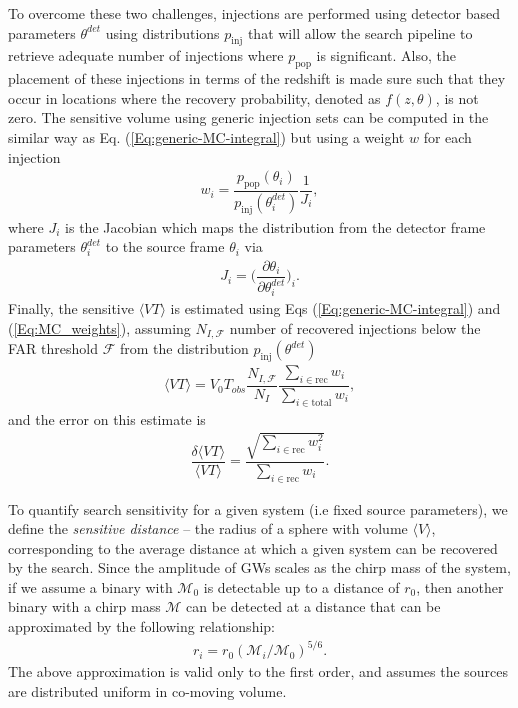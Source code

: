To overcome these two challenges, injections are performed using detector based parameters $\theta^{det}$ using distributions $p_{\text{inj}}$ that will allow the search pipeline to retrieve adequate number of injections where $p_{\text{pop}}$ is significant. Also, the placement of these injections in terms of the redshift is made sure such that they occur in locations where the recovery probability, denoted as $f(z, \theta)$, is not zero. The sensitive volume using generic injection sets can be computed in the similar way as Eq. (\ref{Eq:generic-MC-integral}) but using a weight $w$ for each injection
\begin{align}
    w_i = \dfrac{p_{\text{pop}}(\theta_i)}{p_{\text{inj}}(\theta_{i}^{det})}\dfrac{1}{J_i},
    \label{Eq:MC_weights}
\end{align}
where $J_i$ is the Jacobian which maps the distribution from the detector frame parameters $\theta^{det}_i$ to the source frame $\theta_i$ via
\begin{align}
    J_i = \Bigg(\dfrac{\partial\theta_i}{\partial\theta_{i}^{det}} \Bigg)_i.
\end{align}
Finally, the sensitive $\langle VT \rangle$ is estimated using Eqs (\ref{Eq:generic-MC-integral}) and (\ref{Eq:MC_weights}), assuming $N_{I,\mathcal{F}}$ number of recovered injections below the FAR threshold $\mathcal{F}$ from the distribution $p_{\text{inj}}(\theta^{det})$
\begin{align}
    \langle VT \rangle = V_0T_{obs}\dfrac{N_{I,\mathcal{F}}}{N_I} \dfrac{\sum\limits_{i \in \text{rec}}w_i}{\sum\limits_{i\in \text{total}}w_i},
\end{align}
and the error on this estimate is 
\begin{align}
    \dfrac{\delta \langle VT \rangle}{\langle VT \rangle} = \dfrac{\sqrt{\sum\limits_{i\in \text{rec}}w_i^2}}{\sum\limits_{i \in \text{rec}}w_i}.
\end{align}

To quantify search sensitivity for a given system (i.e fixed source parameters), we define the \textit{sensitive distance} -- the radius of a sphere with volume $\langle V \rangle$, corresponding to the average distance at which a given system can be recovered by the search. Since the amplitude of GWs scales as the chirp mass of the system, if we assume a binary with $\mathcal{M}_0$ is detectable up to a distance of $r_0$, then another binary with a chirp mass $\mathcal{M}$ can be detected at a distance that can be approximated by the following relationship:
\begin{align}
    r_i = r_0 (\mathcal{M}_i/\mathcal{M}_0)^{5/6}.
\end{align}
The above approximation is valid only to the first order, and assumes the sources are distributed
uniform in co-moving volume. 

